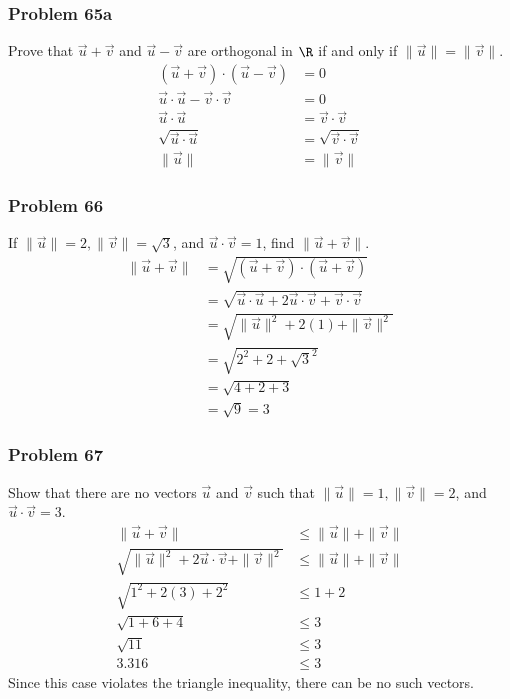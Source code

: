 \documentclass[letterpaper, 12pt]{math}
\begin{document}
\subsubsection*{Problem 65a}
Prove that \( \vec{u}+\vec{v} \) and \( \vec{u}-\vec{v} \) are orthogonal in
\( \R \) if and only if \( \|\vec{u}\| = \|\vec{v}\| \).
\begin{align*}
  (\vec{u}+\vec{v})\cdot(\vec{u}-\vec{v}) &= 0 \\
  \vec{u}\cdot\vec{u}-\vec{v}\cdot\vec{v} &= 0 \\
  \vec{u}\cdot\vec{u} &= \vec{v}\cdot\vec{v} \\
  \sqrt{\vec{u}\cdot\vec{u}} &= \sqrt{\vec{v}\cdot\vec{v}} \\
  \|\vec{u}\| &= \|\vec{v}\|
\end{align*}

\subsubsection*{Problem 66}
If \( \|\vec{u}\| = 2, \|\vec{v}\| = \sqrt{3} \), and \( \vec{u}\cdot\vec{v} =
1 \), find \( \|\vec{u}+\vec{v}\| \).
\begin{align*}
  \|\vec{u}+\vec{v}\| &= \sqrt{(\vec{u}+\vec{v})\cdot(\vec{u}+\vec{v})} \\
  &= \sqrt{\vec{u}\cdot\vec{u}+2\vec{u}\cdot\vec{v}+\vec{v}\cdot\vec{v}} \\
  &= \sqrt{\|\vec{u}\|^2+2(1)+\|\vec{v}\|^2} \\
  &= \sqrt{2^2+2+\sqrt{3}^2} \\
  &= \sqrt{4+2+3} \\
  &= \sqrt{9} = 3
\end{align*}

\subsubsection*{Problem 67}
Show that there are no vectors \( \vec{u} \) and \( \vec{v} \) such that
\( \|\vec{u}\| = 1, \|\vec{v}\| = 2 \), and \( \vec{u}\cdot\vec{v} = 3 \).
\begin{align*}
  \|\vec{u}+\vec{v}\| &\le \|\vec{u}\|+\|\vec{v}\| \\
  \sqrt{\|\vec{u}\|^2+2\vec{u}\cdot\vec{v}+\|\vec{v}\|^2} &\le
    \|\vec{u}\|+\|\vec{v}\| \\
  \sqrt{1^2+2(3)+2^2} &\le 1+2 \\
  \sqrt{1+6+4} &\le 3 \\
  \sqrt{11} &\le 3 \\
  3.316 &\le 3
\end{align*}
Since this case violates the triangle inequality, there can be no such vectors.
\end{document}
